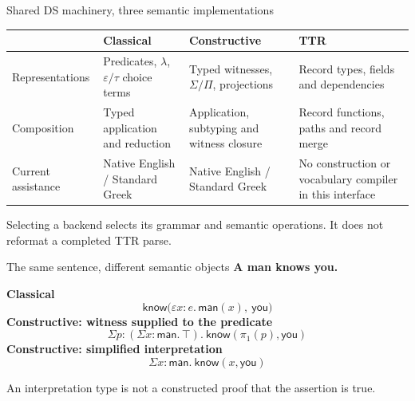 \documentclass[aspectratio=169,11pt]{beamer}
\newcommand{\tagline}[1]{{\small\color{Accent}\bfseries #1}\par\medskip}
\newcommand{\aside}[1]{\par{\small\color{Muted}#1}\par}
\newcommand{\keypoint}[1]{\begin{block}{}#1\end{block}}
\newcommand{\pred}[1]{\mathsf{#1}}
\begin{document}
\begin{frame}{Shared DS machinery, three semantic implementations}
  \color{Ink}
  \small
  \begin{tabularx}{\textwidth}{@{}p{28mm}YYY@{}}\toprule
    & \textbf{Classical} & \textbf{Constructive} & \textbf{TTR}\\\midrule
    Representations & Predicates, $\lambda$, $\varepsilon/\tau$ choice terms & Typed witnesses, $\Sigma/\Pi$, projections & Record types, fields and dependencies\\[5pt]
    Composition & Typed application and reduction & Application, subtyping and witness closure & Record functions, paths and record merge\\[5pt]
    Current assistance & Native English / Standard Greek & Native English / Standard Greek & No construction or vocabulary compiler in this interface\\\bottomrule
  \end{tabularx}\par
  \vspace{4mm}
  \keypoint{Selecting a backend selects its grammar and semantic operations. It does not reformat a completed TTR parse.}
\end{frame}

\begin{frame}{The same sentence, different semantic objects}
  \color{Ink}
  \tagline{A man knows you.}
  \setlength{\abovedisplayskip}{3pt}\setlength{\belowdisplayskip}{6pt}
  \textbf{Classical}
  \[\pred{know}\bigl(\varepsilon x:e.\,\pred{man}(x),\ \pred{you}\bigr)\]
  \textbf{Constructive: witness supplied to the predicate}
  \[\Sigma p:(\Sigma x:\pred{man}.\,\top).\ \pred{know}(\pi_1(p),\pred{you})\]
  \textbf{Constructive: simplified interpretation}
  \[\Sigma x:\pred{man}.\ \pred{know}(x,\pred{you})\]
  \aside{An interpretation type is not a constructed proof that the assertion is true.}
\end{frame}
\end{document}
